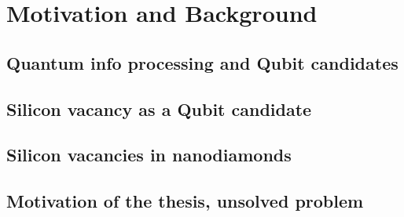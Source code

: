 
\chapter[Motivation and Background]
{Motivation and Background} %

\label{Chapter1} %







\newcommand{\keyword}[1]{\textbf{#1}}
\newcommand{\tabhead}[1]{\textbf{#1}}
\newcommand{\code}[1]{\texttt{#1}}
\newcommand{\file}[1]{\texttt{\bfseries#1}}
\newcommand{\option}[1]{\texttt{\itshape#1}}


\section[Quantum info processing and Qubit candidates]{Quantum info processing and Qubit candidates}



\section[Silicon vacancy as a Qubit candidate]{Silicon vacancy as a Qubit candidate}

\paragraph{}


\section[Silicon vacancies in nanodiamonds]{Silicon vacancies in nanodiamonds}


\section[Motivation of the thesis, unsolved problem]{Motivation of the thesis, unsolved problem}

